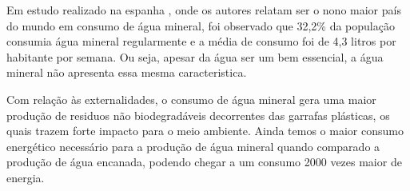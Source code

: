 \documentclass[
  12pt,
]{book}
\begin{document}
Em estudo realizado na espanha \citep{martasuarez}, onde os autores relatam ser o nono maior país do mundo em consumo de água mineral, foi observado que 32,2\% da população consumia água mineral regularmente e a média de consumo foi de 4,3 litros por habitante por semana. Ou seja, apesar da água ser um bem essencial, a água mineral não apresenta essa mesma caracteristica.

Com relação às externalidades, o consumo de água mineral gera uma maior produção de residuos não biodegradáveis decorrentes das garrafas plásticas, os quais trazem forte impacto para o meio ambiente. Ainda temos o maior consumo energético necessário para a produção de água mineral quando comparado a produção de água encanada, podendo chegar a um consumo 2000 vezes maior de energia\citep{martasuarez}.

  
\end{document}
